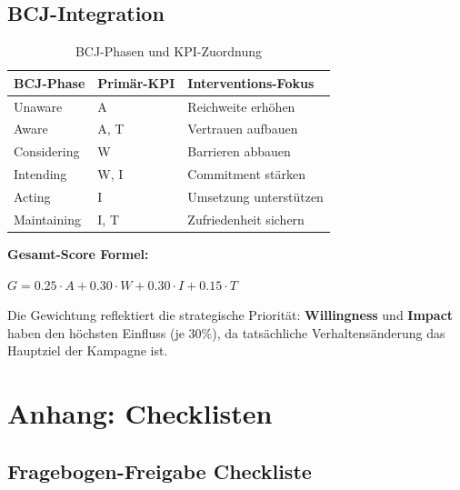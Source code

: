 \documentclass[11pt,a4paper]{article}
\begin{document}
\subsection{BCJ-Integration}

\begin{table}[h]
\centering
{}
\begin{tabular}{L{3cm}C{2cm}L{6cm}}
\toprule
\textbf{BCJ-Phase} & \textbf{Primär-KPI} & \textbf{Interventions-Fokus} \\
\midrule
Unaware & A & Reichweite erhöhen \\
Aware & A, T & Vertrauen aufbauen \\
Considering & W & Barrieren abbauen \\
Intending & W, I & Commitment stärken \\
Acting & I & Umsetzung unterstützen \\
Maintaining & I, T & Zufriedenheit sichern \\
\bottomrule
\end{tabular}
\caption{BCJ-Phasen und KPI-Zuordnung}
\end{table}

\begin{tcolorbox}[fabox]
\textbf{Gesamt-Score Formel:}

\vspace{0.3cm}
\centering
\Large
$G = 0.25 \cdot A + 0.30 \cdot W + 0.30 \cdot I + 0.15 \cdot T$

\vspace{0.3cm}
\normalsize
\raggedright
Die Gewichtung reflektiert die strategische Priorität: \textbf{Willingness} und \textbf{Impact} haben den höchsten Einfluss (je 30\%), da tatsächliche Verhaltensänderung das Hauptziel der Kampagne ist.
\end{tcolorbox}

\newpage

\section{Anhang: Checklisten}

\subsection{Fragebogen-Freigabe Checkliste}
\end{document}
